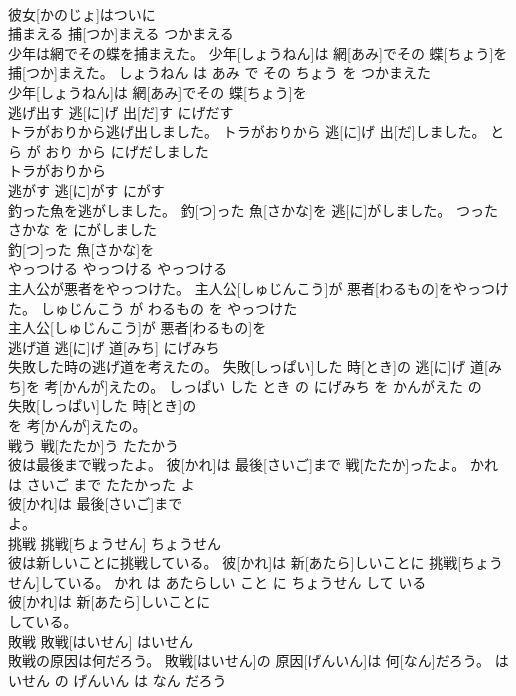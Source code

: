 \documentclass[8pt]{extreport}
\begin{document}
\begin{CJK}{UTF8}{min}
\\	彼女[かのじょ]はついに
\\	捕まえる	捕[つか]まえる	つかまえる	
\\	少年は網でその蝶を捕まえた。	少年[しょうねん]は 網[あみ]でその 蝶[ちょう]を 捕[つか]まえた。	しょうねん は あみ で その ちょう を つかまえた	
\\	少年[しょうねん]は 網[あみ]でその 蝶[ちょう]を
\\	逃げ出す	逃[に]げ 出[だ]す	にげだす	
\\	トラがおりから逃げ出しました。	トラがおりから 逃[に]げ 出[だ]しました。	とら が おり から にげだしました	
\\	トラがおりから
\\	逃がす	逃[に]がす	にがす	
\\	釣った魚を逃がしました。	釣[つ]った 魚[さかな]を 逃[に]がしました。	つった さかな を にがしました	
\\	釣[つ]った 魚[さかな]を
\\	やっつける	やっつける	やっつける	
\\	主人公が悪者をやっつけた。	主人公[しゅじんこう]が 悪者[わるもの]をやっつけた。	しゅじんこう が わるもの を やっつけた	
\\	主人公[しゅじんこう]が 悪者[わるもの]を
\\	逃げ道	逃[に]げ 道[みち]	にげみち	
\\	失敗した時の逃げ道を考えたの。	失敗[しっぱい]した 時[とき]の 逃[に]げ 道[みち]を 考[かんが]えたの。	しっぱい した とき の にげみち を かんがえた の	
\\	失敗[しっぱい]した 時[とき]の
\\	を 考[かんが]えたの。			
\\	戦う	戦[たたか]う	たたかう	
\\	彼は最後まで戦ったよ。	彼[かれ]は 最後[さいご]まで 戦[たたか]ったよ。	かれ は さいご まで たたかった よ	
\\	彼[かれ]は 最後[さいご]まで
\\	よ。			
\\	挑戦	挑戦[ちょうせん]	ちょうせん	
\\	彼は新しいことに挑戦している。	彼[かれ]は 新[あたら]しいことに 挑戦[ちょうせん]している。	かれ は あたらしい こと に ちょうせん して いる	
\\	彼[かれ]は 新[あたら]しいことに
\\	している。			
\\	敗戦	敗戦[はいせん]	はいせん	
\\	敗戦の原因は何だろう。	敗戦[はいせん]の 原因[げんいん]は 何[なん]だろう。	はいせん の げんいん は なん だろう	

\end{CJK}
\end{document}
